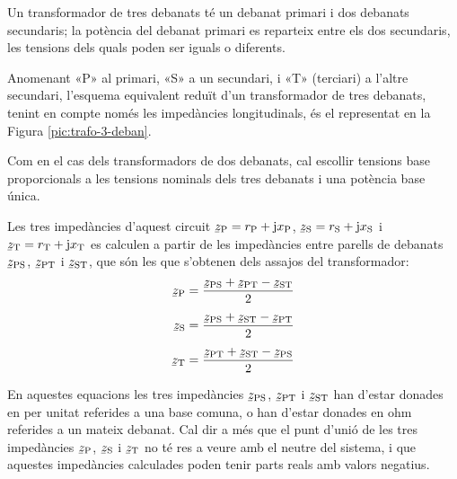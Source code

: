 Un transformador de tres debanats té un debanat primari i dos debanats secundaris; la potència del debanat primari es reparteix entre els dos secundaris, les tensions dels quals poden ser iguals o diferents.

Anomenant «P» al primari, «S» a un secundari, i «T» (terciari) a l'altre secundari, l'esquema equivalent reduït d'un transformador de tres debanats, tenint en compte només les impedàncies longitudinals,  és el representat en la Figura \vref{pic:trafo-3-deban}.

\begin{center}
    
    \label{pic:trafo-3-deban}
\end{center}

Com en el cas dels transformadors de dos debanats, cal escollir tensions base proporcionals a les tensions nominals dels tres debanats i una potència base única.

Les tres impedàncies d'aquest circuit $\cmplx{z}\ped{P} = r\ped{P} + \ju x\ped{P}$, $\cmplx{z}\ped{S} = r\ped{S} + \ju x\ped{S}$ i $\cmplx{z}\ped{T} = r\ped{T} + \ju x\ped{T}$ es calculen a partir de les impedàncies entre parells de debanats $\cmplx{z}\ped{PS}$, $\cmplx{z}\ped{PT}$ i $\cmplx{z}\ped{ST}$, que són les que s'obtenen dels assajos del transformador:
\begin{subequations}
\begin{align}
    \cmplx{z}\ped{P} &= \frac{\cmplx{z}\ped{PS}+\cmplx{z}\ped{PT}-\cmplx{z}\ped{ST}}{2}  \\[1ex]
    \cmplx{z}\ped{S} &= \frac{\cmplx{z}\ped{PS}+\cmplx{z}\ped{ST}-\cmplx{z}\ped{PT}}{2}  \\[1ex]
    \cmplx{z}\ped{T} &= \frac{\cmplx{z}\ped{PT}+\cmplx{z}\ped{ST}-\cmplx{z}\ped{PS}}{2}
\end{align}
\end{subequations}

En aquestes equacions  les tres impedàncies $\cmplx{z}\ped{PS}$, $\cmplx{z}\ped{PT}$ i $\cmplx{z}\ped{ST}$ han d'estar donades en per unitat referides a una base comuna, o han d'estar donades en ohm referides a un mateix debanat. Cal dir a més que el punt d'unió de les tres impedàncies $\cmplx{z}\ped{P}$, $\cmplx{z}\ped{S}$ i $\cmplx{z}\ped{T}$ no té res a veure amb el neutre del sistema, i que aquestes impedàncies calculades poden tenir parts reals amb valors  negatius.


